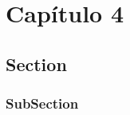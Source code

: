 \chapter{Capítulo 4}\label{cap:4}

\lipsum
\section{Section}
\lipsum
\subsection{SubSection}
\lipsum

